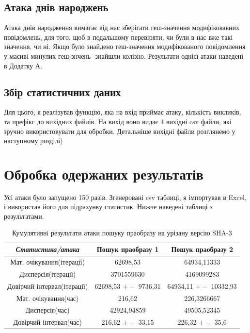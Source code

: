 \documentclass[12pt]{article}
\begin{document}
\subsection{Атака днів народжень}

Атака днів народження вимагає від нас зберігати геш-значення модифіковавних повідомлень, для того, щоб в подальшому перевіряти, чи були в нас вже такі значення, чи ні. Якщо було знайдено геш-значення модифікованого повідомлення у масиві минулих геш-знчень- знайшли колізію. Результати однієї атаки наведені в Додатку А.

\subsection{Збір статистичних даних}

Для цього, я реалізував функцію, яка на вхід приймає атаку, кількість викликів, та префікс до вихідних файлів. На вихід воно видає 4 вихідні csv файли, які зручно використовувати для обробки. Детальніше вихідні файли розглянемо у наступному розділі)

\section{Обробка одержаних результатів}

Усі атаки було запущено 150 разів. Згенеровані csv таблиці, я імпортував в Excel, і використав його для підрахунку статистик. Нижче наведені таблиці з результатами.  

\begin{center}    
\begin{table}[H]
\centering
\begin{tabular}{|c|c|c|}
\hline
\textit{\textbf{Статистика/атака}} & Пошук праобразу 1     & Пошук праобразу 2      \\ \hline
Мат. очікування(ітерації)          & 62698,53              & 64934,11333            \\ \hline
Дисперсія(ітерації)                & 3701559630            & 4169099283             \\ \hline
Довірчий   інтервал(ітерації)      & 62698,53 $+-$ 9736,31 & 64934,11 $+-$ 10332,93 \\ \hline
Мат. очікування(час)               & 216,62                & 226,3266667            \\ \hline
Дисперсія(час)                     & 42924,94859           & 49505,52345            \\ \hline
Довірчий інтервал(час)             & 216,62   $+-$ 33,15     & 226,32 $+-$ 35,6         \\ \hline
\end{tabular}
\caption{Кумулятивнi результати атаки пошуку праобразу на урізану версію SHA-3}
\label{tab:results_preimage}
\end{table}
\end{center}
\end{document}
